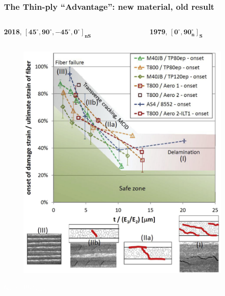 \documentclass[first,firstsupp,lastsupp,last,hyperref,table]{ETHclass}
\begin{document}
\begin{frame}
\frametitle{\vspace{0.3cm}\small The Thin-ply ``Advantage'': new material, old result}
\vspace{-0.8cm}
\centering
\begin{columns}[t]
\begin{column}{0.5\textwidth}
\centering
\tiny
\textbf{2018}, $\mathbf{\left[45^{\circ}, 90^{\circ},-45^{\circ},0^{\circ}\right]_{nS}}$
\end{column}
\begin{column}{0.5\textwidth}
\centering
\tiny
\textbf{1979}, $\mathbf{\left[0^{\circ}, 90^{\circ}_{n}\right]_{S}}$
\end{column}
\end{columns}
\vspace{-0.4cm}
\begin{columns}[c]
\begin{column}{0.5\textwidth}
\begin{figure}
\centering
\includegraphics[width=0.9\columnwidth]{thinply-plythicknesseffect.jpg}
\end{figure}
\vspace{-0.6cm}
\centering
\textcolor{white}{\tiny$t_{90^{\circ}}<10\diameter_{fiber}$}
\end{column}
\begin{column}{0.5\textwidth}

\end{column}
\end{columns}
\end{frame}
\end{document}
